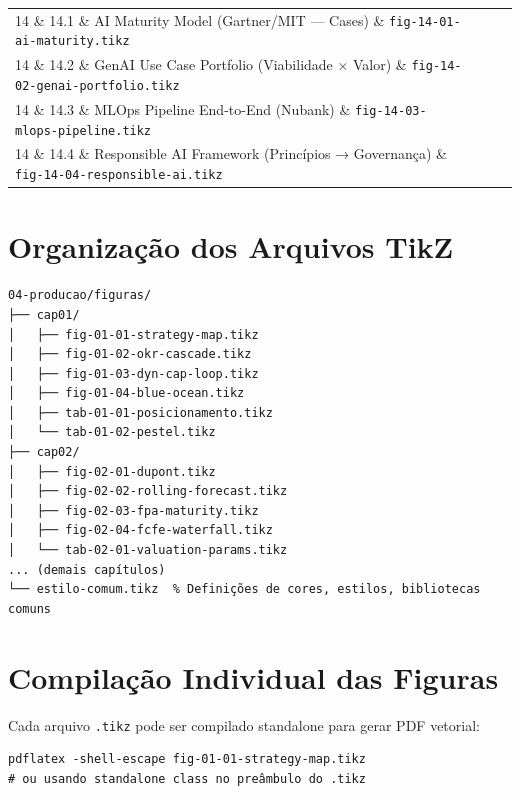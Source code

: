 \begin{longtable}{p{1.5cm}p{4cm}p{5.5cm}p{4cm}}
14 \& 14.1 \& AI Maturity Model (Gartner/MIT — Cases) \& \texttt{fig-14-01-ai-maturity.tikz}\\
14 \& 14.2 \& GenAI Use Case Portfolio (Viabilidade × Valor) \& \texttt{fig-14-02-genai-portfolio.tikz}\\
14 \& 14.3 \& MLOps Pipeline End-to-End (Nubank) \& \texttt{fig-14-03-mlops-pipeline.tikz}\\
14 \& 14.4 \& Responsible AI Framework (Princípios → Governança) \& \texttt{fig-14-04-responsible-ai.tikz}\\

\end{longtable}

\section*{Organização dos Arquivos TikZ}
\begin{verbatim}
04-producao/figuras/
├── cap01/
│   ├── fig-01-01-strategy-map.tikz
│   ├── fig-01-02-okr-cascade.tikz
│   ├── fig-01-03-dyn-cap-loop.tikz
│   ├── fig-01-04-blue-ocean.tikz
│   ├── tab-01-01-posicionamento.tikz
│   └── tab-01-02-pestel.tikz
├── cap02/
│   ├── fig-02-01-dupont.tikz
│   ├── fig-02-02-rolling-forecast.tikz
│   ├── fig-02-03-fpa-maturity.tikz
│   ├── fig-02-04-fcfe-waterfall.tikz
│   └── tab-02-01-valuation-params.tikz
... (demais capítulos)
└── estilo-comum.tikz  % Definições de cores, estilos, bibliotecas comuns
\end{verbatim}

\section*{Compilação Individual das Figuras}
Cada arquivo \texttt{.tikz} pode ser compilado standalone para gerar PDF vetorial:
\begin{verbatim}
pdflatex -shell-escape fig-01-01-strategy-map.tikz
# ou usando standalone class no preâmbulo do .tikz
\end{verbatim}

